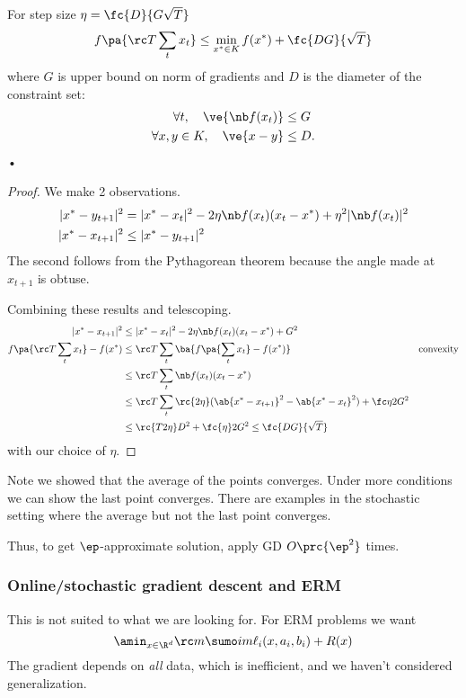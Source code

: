 \begin{thm}
For %
step size $\eta=\fc{D}{G\sqrt T}$
$$f\pa{\rc T\sum_t x_t}\le \min_{x^*\in K} f(x^*)+ \fc{DG}{\sqrt T}$$
where $G$ is upper bound on norm of gradients and $D$ is the diameter of the constraint set:
\begin{align}
\forall t, \quad \ve{\nb f(x_t)}&\le G\\
\forall x,y\in K, \quad \ve{x-y}&\le D.
\end{align}•
\end{thm}

\begin{proof}
We make 2 observations.
\begin{align}
|x^*-y_{t+1}|^2 &=|x^*-x_t|^2 - 2\eta \nb f(x_t) (x_t-x^*) + \eta^2|\nb f(x_t)|^2
\label{eq:gd-obs1}
\\
|x^*-x_{t+1}|^2&\le |x^* -y_{t+1}|^2
\label{eq:gd-obs2}
\end{align}
The second follows from the Pythagorean theorem because the angle made at $x_{t+1}$ is obtuse.

Combining these results and telescoping.
\begin{align}
|x^*-x_{t+1}|^2 &\le |x^*-x_t|^2 - 2\eta \nb f(x_t) (x_t-x^*)  + G^2\\
f\pa{\rc T \sum_t x_t} - f(x^*) &\le 
\rc T\sum_t \ba{f\pa{\sum_t x_t} - f(x^*)}&\text{convexity}\\
&\le \rc T \sum_t \nb f(x_t)(x_t-x^*)\\
&\le \rc T\sum_t \rc{2\eta} (\ab{x^*-x_{t+1}}^2-\ab{x^*-x_t}^2)+\fc\eta 2 G^2\\
&\le \rc{T2\eta} D^2 + \fc{\eta}2G^2 \le \fc{DG}{\sqrt T}
\end{align}
with our choice of $\eta$.
\end{proof}
Note we showed that the average of the points converges. Under more conditions we can show the last point converges. There are examples in the stochastic setting where the average but not the last point converges.

Thus, to get $\ep$-approximate solution, apply GD $O\prc{\ep^2}$ times.

\subsubsection{Online/stochastic gradient descent and ERM}

This is not suited to what we are looking for. For ERM problems we want
$$
\amin_{x\in \R^d} \rc m \sumo im \ell_i(x,a_i,b_i) + R(x)
$$
The gradient depends on \emph{all} data, which is inefficient, and we haven't considered generalization.

